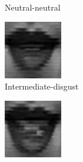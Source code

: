 \begin{figure}
\begin{subfigure}[b]{0.15\textwidth}
		\caption{Neutral-neutral}
		\label{fig:timeseriesHappy:c}
	\end{subfigure}
	\begin{subfigure}[b]{0.15\textwidth}
		\includegraphics[width=\textwidth]{./img/timeseriesHappy/S026_006_00000004.png}
		\caption{Intermediate-disgust}
		\label{fig:timeseriesHappy:d}
	\end{subfigure}
	\begin{subfigure}[b]{0.15\textwidth}
		\includegraphics[width=\textwidth]{./img/timeseriesHappy/S026_006_00000005.png}

\end{subfigure}
\end{figure}
